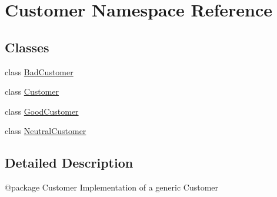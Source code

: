 \hypertarget{namespace_customer}{}\section{Customer Namespace Reference}
\label{namespace_customer}
\subsection*{Classes}
\begin{DoxyCompactItemize}
\item 
class \mbox{\hyperlink{class_customer_1_1_bad_customer}{Bad\+Customer}}
\item 
class \mbox{\hyperlink{class_customer_1_1_customer}{Customer}}
\item 
class \mbox{\hyperlink{class_customer_1_1_good_customer}{Good\+Customer}}
\item 
class \mbox{\hyperlink{class_customer_1_1_neutral_customer}{Neutral\+Customer}}
\end{DoxyCompactItemize}


\subsection{Detailed Description}
\begin{DoxyVerb}@package Customer
Implementation of a generic Customer
\end{DoxyVerb}
 